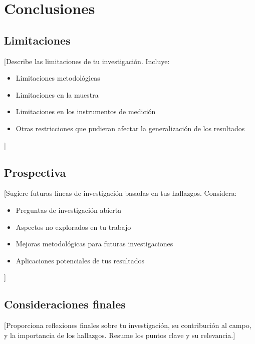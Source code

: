 \chapter{Conclusiones}

\section{Limitaciones}

[Describe las limitaciones de tu investigación. Incluye:

\begin{itemize}
    \item Limitaciones metodológicas
    \item Limitaciones en la muestra
    \item Limitaciones en los instrumentos de medición
    \item Otras restricciones que pudieran afectar la generalización de los resultados
\end{itemize}
]

\section{Prospectiva}

[Sugiere futuras líneas de investigación basadas en tus hallazgos. Considera:

\begin{itemize}
    \item Preguntas de investigación abierta
    \item Aspectos no explorados en tu trabajo
    \item Mejoras metodológicas para futuras investigaciones
    \item Aplicaciones potenciales de tus resultados
\end{itemize}
]

\section{Consideraciones finales}

[Proporciona reflexiones finales sobre tu investigación, su contribución al campo, y la importancia
de los hallazgos. Resume los puntos clave y su relevancia.]
